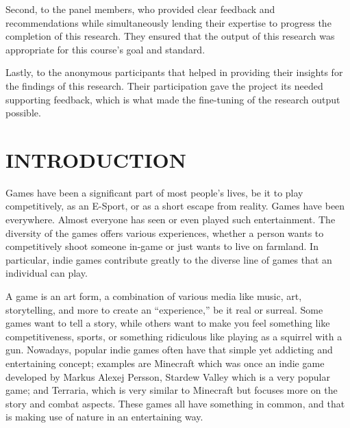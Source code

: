 \documentclass[11pt]{research}
\begin{document}
Second, to the panel members, who provided clear feedback and recommendations while simultaneously lending their expertise to progress the completion of this research. They ensured that the output of this research was appropriate for this course’s goal and standard.

Lastly, to the anonymous participants that helped in providing their insights for the findings of this research. Their participation gave  the project its needed supporting feedback, which is what made the fine-tuning of the research output possible.
\clearpage

\tableofcontents
\clearpage

\listoffigures
\clearpage

\listoftables
\clearpage

\setcounter{page}{2}    %

\chapter{\textbf{INTRODUCTION}}

Games have been a significant part of most people's lives, be it to play competitively, as an E-Sport, or as a short escape from reality. Games have been everywhere. Almost everyone has seen or even played such entertainment. The diversity of the games offers various experiences, whether a person wants to competitively shoot someone in-game or just wants to live on farmland. In particular, indie games contribute greatly to the diverse line of games that an individual can play. 

A game is an art form, a combination of various media like music, art, storytelling, and more to create an “experience,” be it real or surreal. Some games want to tell a story, while others want to make you feel something like competitiveness, sports, or something ridiculous like playing as a squirrel with a gun. Nowadays, popular indie games often have that simple yet addicting and entertaining concept; examples are Minecraft which was once an indie game developed by Markus Alexej Persson, Stardew Valley which is a very popular game; and Terraria, which is very similar to Minecraft but focuses more on the story and combat aspects. These games all have something in common, and that is making use of nature in an entertaining way. 
\end{document}
